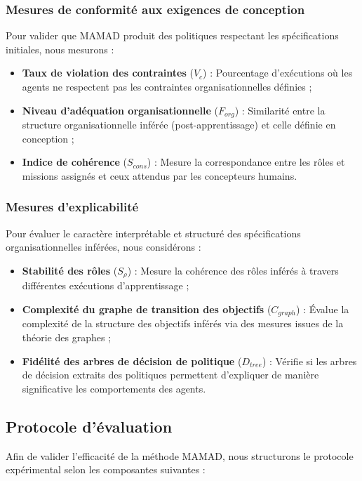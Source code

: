 \documentclass[pdflatex,sn-mathphys-num]{sn-jnl}%
\theoremstyle{thmstyleone}%
\theoremstyle{thmstyletwo}%
\theoremstyle{thmstylethree}%
\begin{document}
\subsubsection{Mesures de conformité aux exigences de conception}
Pour valider que MAMAD produit des politiques respectant les spécifications initiales, nous mesurons :
\begin{itemize}
    \item \textbf{Taux de violation des contraintes} ($V_c$) : Pourcentage d'exécutions où les agents ne respectent pas les contraintes organisationnelles définies ;
    \item \textbf{Niveau d'adéquation organisationnelle} ($F_{org}$) : Similarité entre la structure organisationnelle inférée (post-apprentissage) et celle définie en conception ;
    \item \textbf{Indice de cohérence} ($S_{cons}$) : Mesure la correspondance entre les rôles et missions assignés et ceux attendus par les concepteurs humains.
\end{itemize}

\subsubsection{Mesures d'explicabilité}
Pour évaluer le caractère interprétable et structuré des spécifications organisationnelles inférées, nous considérons :
\begin{itemize}
    \item \textbf{Stabilité des rôles} ($S_{\rho}$) : Mesure la cohérence des rôles inférés à travers différentes exécutions d'apprentissage ;
    \item \textbf{Complexité du graphe de transition des objectifs} ($C_{graph}$) : Évalue la complexité de la structure des objectifs inférés via des mesures issues de la théorie des graphes ;
    \item \textbf{Fidélité des arbres de décision de politique} ($D_{tree}$) : Vérifie si les arbres de décision extraits des politiques permettent d'expliquer de manière significative les comportements des agents.
\end{itemize}

\subsection{Protocole d'évaluation}

Afin de valider l'efficacité de la méthode MAMAD, nous structurons le protocole expérimental selon les composantes suivantes :
\end{document}

